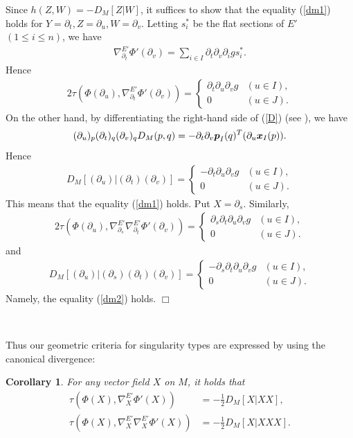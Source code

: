 \documentclass[10pt]{amsart}
\def\qed{\hfill $\Box$}
\def\qed{\hfill $\Box$}
\def\rd{\partial}
\def\bx{\mbox{\boldmath $x$}}
\def\bp{\mbox{\boldmath $p$}}
\newtheorem{cor}[thm]{\bf Corollary}
\begin{document}
Since $h(Z, W)=-D_M[Z|W]$, it suffices to show that the equality (\ref{dm1}) holds for $Y=\rd_t, Z=\rd_u, W=\rd_v$.
Letting $s^*_i$ be the flat sections of $E'$ $(1\leq i\leq n)$, we have
\begin{align*}
\nabla^{E'}_{\rd_t}\Phi'(\rd_v) = \sum_{i\in I}\rd_t\rd_v\rd_i g s^*_i.
\end{align*}
Hence 
\begin{align*}
2\tau(\Phi(\rd_u), \nabla^{E'}_{\rd_t}\Phi'(\rd_v)) =
\left\{
\begin{array}{ll}
\rd_t\rd_u\rd_v g &(u\in I),\\
0 &(u\in J).
\end{array}
\right.
\end{align*}
On the other hand, by differentiating the right-hand side of (\ref{D}) (see \cite{NT}), we have
\begin{align*}
(\rd_u)_p(\rd_t)_q(\rd_v)_qD_M(p, q) = -\rd_t\rd_v\bp_I(q)^T(\rd_u\bx_I(p)).
\end{align*}
Hence
\begin{align*}
D_M[(\rd_u)|(\rd_t)(\rd_v)] = 
\left\{
\begin{array}{ll}
-\rd_t\rd_u\rd_v g &(u\in I),\\
0 &(u\in J).
\end{array}
\right.
\end{align*}
This means that the equality (\ref{dm1}) holds. Put $X=\rd_s$. Similarly, 
\begin{align*}
2\tau(\Phi(\rd_u), \nabla^{E'}_{\rd_s}\nabla^{E'}_{\rd_t}\Phi'(\rd_v)) =
\left\{
\begin{array}{ll}
\rd_s\rd_t\rd_u\rd_v g &(u\in I),\\
0 &(u\in J).
\end{array}
\right.
\end{align*}
and 
\begin{align*}
D_M[(\rd_u)|(\rd_s)(\rd_t)(\rd_v)]=
\left\{
\begin{array}{ll}
-\rd_s\rd_t\rd_u\rd_v g &(u\in I),\\
0 &(u\in J).
\end{array}
\right.
\end{align*}
Namely, the equality (\ref{dm2}) holds.
\qed

\

Thus our geometric criteria for singularity types are expressed by using the canonical divergence: 
\begin{cor}\label{DXXXX}
For any vector field $X$ on $M$, it holds that
\begin{align}
\tau(\Phi(X), \nabla^{E'}_X\Phi'(X)) &= -\frac{1}{2}D_M[X|XX],\label{div1}\\
\tau(\Phi(X), \nabla^{E'}_X\nabla^{E'}_X\Phi'(X)) &= -\frac{1}{2}D_M[X|XXX]\label{div2}.
\end{align}
\end{cor}
\end{document}
